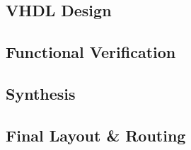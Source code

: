 \subsection{VHDL Design}


\subsection{Functional Verification}



\subsection{Synthesis}



\subsection{Final Layout \& Routing}
